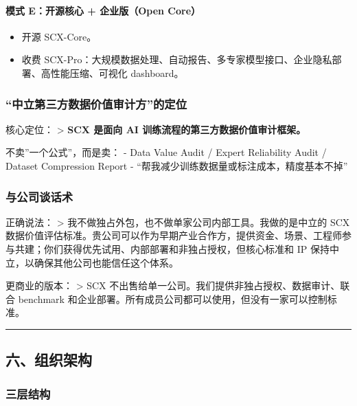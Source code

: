 \documentclass[
  12pt,
]{ctexart}
\providecommand{\tightlist}{%
  \setlength{\itemsep}{0pt}\setlength{\parskip}{0pt}}
\begin{document}
\paragraph{模式 E：开源核心 + 企业版（Open
Core）}\label{ux6a21ux5f0f-eux5f00ux6e90ux6838ux5fc3-ux4f01ux4e1aux7248open-core}

\begin{itemize}
\tightlist
\item
  开源 SCX-Core。
\item
  收费
  SCX-Pro：大规模数据处理、自动报告、多专家模型接口、企业隐私部署、高性能压缩、可视化
  dashboard。
\end{itemize}

\subsubsection{``中立第三方数据价值审计方''的定位}\label{ux4e2dux7acbux7b2cux4e09ux65b9ux6570ux636eux4ef7ux503cux5ba1ux8ba1ux65b9ux7684ux5b9aux4f4d}

核心定位： \textgreater{} \textbf{SCX 是面向 AI
训练流程的第三方数据价值审计框架。}

不卖''一个公式''，而是卖： - Data Value Audit / Expert Reliability Audit
/ Dataset Compression Report -
``帮我减少训练数据量或标注成本，精度基本不掉''

\subsubsection{与公司谈话术}\label{ux4e0eux516cux53f8ux8c08ux8bddux672f}

正确说法： \textgreater{}
我不做独占外包，也不做单家公司内部工具。我做的是中立的 SCX
数据价值评估标准。贵公司可以作为早期产业合作方，提供资金、场景、工程师参与共建；你们获得优先试用、内部部署和非独占授权，但核心标准和
IP 保持中立，以确保其他公司也能信任这个体系。

更商业的版本： \textgreater{} SCX
不出售给单一公司。我们提供非独占授权、数据审计、联合 benchmark
和企业部署。所有成员公司都可以使用，但没有一家可以控制标准。

\begin{center}\rule{0.5\linewidth}{0.5pt}\end{center}

\subsection{六、组织架构}\label{ux516dux7ec4ux7ec7ux67b6ux6784}

\subsubsection{三层结构}\label{ux4e09ux5c42ux7ed3ux6784}
\end{document}
